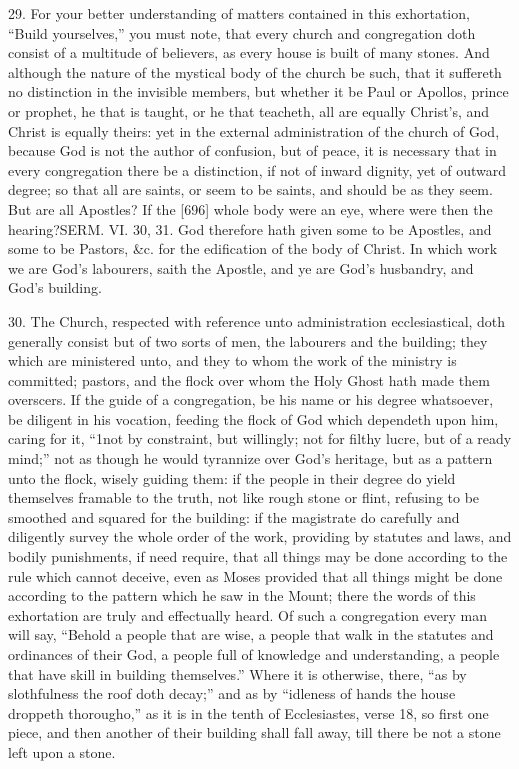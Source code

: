 29. For your better understanding of matters contained in this exhortation, “Build yourselves,” you must note, that every church and congregation doth consist of a multitude of believers, as every house is built of many stones. And although the nature of the mystical body of the church be such, that it suffereth no distinction in the invisible members, but whether it be Paul or Apollos, prince or prophet, he that is taught, or he that teacheth, all are equally Christ’s, and Christ is equally theirs: yet in the external administration of the church of God, because God is not the author of confusion, but of peace, it is necessary that in every congregation there be a distinction, if not of inward dignity, yet of outward degree; so that all are saints, or seem to be saints, and should be as they seem. But are all Apostles? If the [696] whole body were an eye, where were then the hearing?SERM. VI. 30, 31. God therefore hath given some to be Apostles, and some to be Pastors, &c. for the edification of the body of Christ. In which work we are God’s labourers, saith the Apostle, and ye are God’s husbandry, and God’s building.

30. The Church, respected with reference unto administration ecclesiastical, doth generally consist but of two sorts of men, the labourers and the building; they which are ministered unto, and they to whom the work of the ministry is committed; pastors, and the flock over whom the Holy Ghost hath made them overscers. If the guide of a congregation, be his name or his degree whatsoever, be diligent in his vocation, feeding the flock of God which dependeth upon him, caring for it, “1not by constraint, but willingly; not for filthy lucre, but of a ready mind;” not as though he would tyrannize over God’s heritage, but as a pattern unto the flock, wisely guiding them: if the people in their degree do yield themselves framable to the truth, not like rough stone or flint, refusing to be smoothed and squared for the building: if the magistrate do carefully and diligently survey the whole order of the work, providing by statutes and laws, and bodily punishments, if need require, that all things may be done according to the rule which cannot deceive, even as Moses provided that all things might be done according to the pattern which he saw in the Mount; there the words of this exhortation are truly and effectually heard. Of such a congregation every man will say, “Behold a people that are wise, a people that walk in the statutes and ordinances of their God, a people full of knowledge and understanding, a people that have skill in building themselves.” Where it is otherwise, there, “as by slothfulness the roof doth decay;” and as by “idleness of hands the house droppeth thorougho,” as it is in the tenth of Ecclesiastes, verse 18, so first one piece, and then another of their building shall fall away, till there be not a stone left upon a stone.

